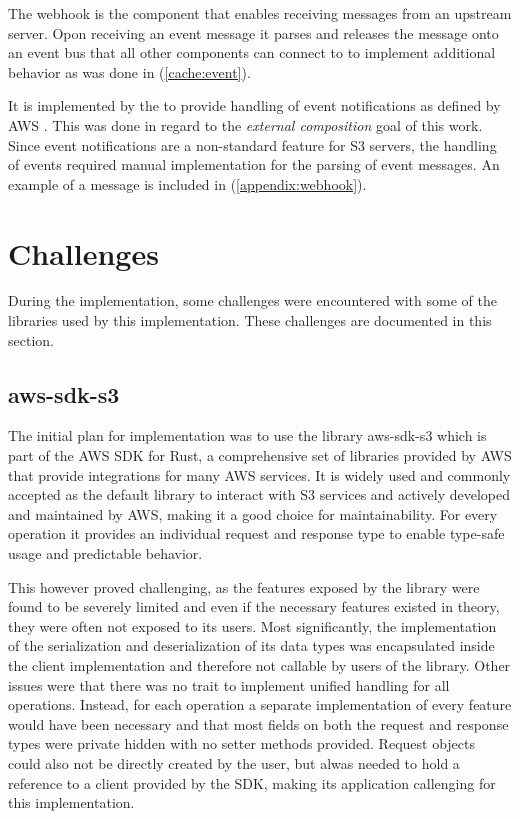 The webhook is the component that enables receiving messages from an upstream server. Opon receiving an event message it parses and releases the message onto an event bus that all other components can connect to to implement additional behavior as was done in (\ref{cache:event}).

It is implemented by the  to provide handling of event notifications as defined by AWS \cite{AWS_S3_USER_GUIDE}. This was done in regard to the \textit{external composition} goal of this work. Since event notifications are a non-standard feature for S3 servers, the handling of events required manual implementation for the parsing of event messages. An example of a message is included in (\ref{appendix:webhook}).

\section{Challenges}

During the implementation, some challenges were encountered with some of the libraries used by this implementation. These challenges are documented in this section.

\subsection{aws-sdk-s3}
The initial plan for implementation was to use the library aws-sdk-s3 which is part of the AWS SDK for Rust, a comprehensive set of libraries provided by AWS that provide integrations for many AWS services\cite{AWS_SDK_GITHUB}. It is widely used and commonly accepted as the default library to interact with S3 services and actively developed and maintained by AWS, making it a good choice for maintainability. For every operation it provides an individual request and response type to enable type-safe usage and predictable behavior.

This however proved challenging, as the features exposed by the library were found to be severely limited and even if the necessary features existed in theory, they were often not exposed to its users.
Most significantly, the implementation of the serialization and deserialization of its data types was encapsulated inside the client implementation and therefore not callable by users of the library.
Other issues were that there was no trait to implement unified handling for all operations. Instead, for each operation a separate implementation of every feature would have been necessary and that most fields on both the request and response types were private hidden with no setter methods provided. Request objects could also not be directly created by the user, but alwas needed to hold a reference to a client provided by the SDK, making its application callenging for this implementation.

